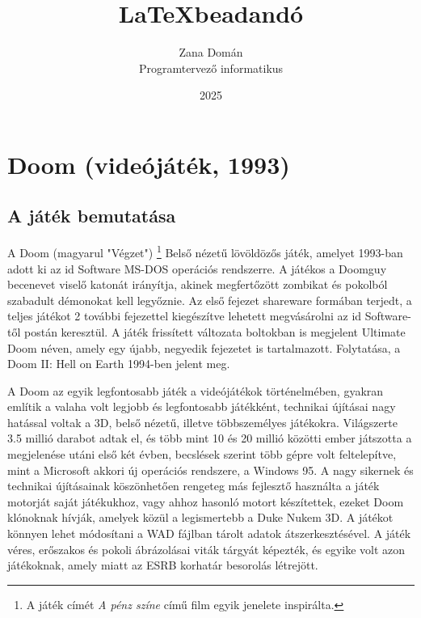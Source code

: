 \documentclass{thesis-ekf}
\theoremstyle{definition}
\theoremstyle{remark}
\begin{document}
\title{\LaTeX beadandó}
\author{Zana Domán\\Programtervező informatikus}
\date{2025}
\maketitle

\tableofcontents

\chapter{Doom (videójáték, 1993)}

\section{A játék bemutatása}

A Doom (magyarul "Végzet") \footnote{A játék címét \textit{A pénz színe} című
film egyik jenelete inspirálta.} Belső nézetű lövöldözős játék, amelyet 1993-ban
adott ki az id Software MS-DOS operációs rendszerre. A játékos a Doomguy
becenevet viselő katonát irányítja, akinek megfertőzött zombikat és pokolból
szabadult démonokat kell legyőznie. Az első fejezet shareware formában terjedt,
a teljes játékot 2 további fejezettel kiegészítve lehetett megvásárolni az id
Software-től postán keresztül. A játék frissített változata boltokban is
megjelent Ultimate Doom néven, amely egy újabb, negyedik fejezetet is
tartalmazott. Folytatása, a Doom II: Hell on Earth 1994-ben jelent meg.

A Doom az egyik legfontosabb játék a videójátékok történelmében, gyakran említik
a valaha volt legjobb és legfontosabb játékként, technikai újításai nagy
hatással voltak a 3D, belső nézetű, illetve többszemélyes játékokra.
Világszerte 3.5 millió darabot adtak el, és több mint 10 és 20 millió közötti
ember játszotta a megjelenése utáni első két évben, becslések szerint több
gépre volt feltelepítve, mint a Microsoft akkori új operációs rendszere, a
Windows 95. A nagy sikernek és technikai újításainak köszönhetően rengeteg
más fejlesztő használta a játék motorját saját játékukhoz, vagy ahhoz hasonló
motort készítettek, ezeket Doom klónoknak hívják, amelyek közül a legismertebb
a Duke Nukem 3D. A játékot könnyen lehet módosítani a WAD fájlban tárolt adatok
átszerkesztésével. A játék véres, erőszakos és pokoli ábrázolásai viták tárgyát
képezték, és egyike volt azon játékoknak, amely miatt az ESRB korhatár
besorolás létrejött.
\end{document}
